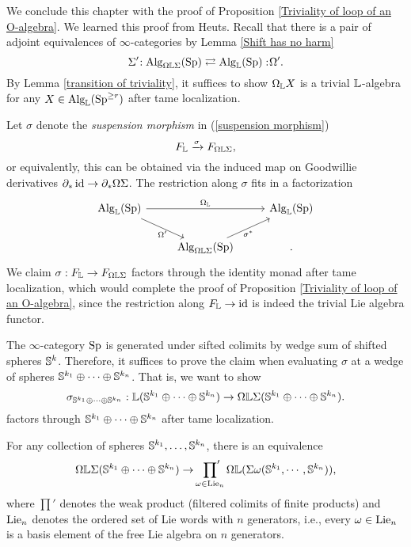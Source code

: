 We conclude this chapter with the proof of Proposition \ref{Triviality of loop of an O-algebra}.
We learned this proof from Heuts. 
Recall that there is a pair of adjoint equivalences of $\infty$-categories by Lemma \ref{Shift has no harm} 
$$
\Sigma'\negmedspace: \operatorname{Alg}_{\Omega {\mathbb{L}} \Sigma}(\operatorname{Sp}) \rightleftarrows \operatorname{Alg}_{{\mathbb{L}}}(\operatorname{Sp}):\negmedspace \Omega'.
$$
By Lemma \ref{transition of triviality},
it suffices to show $\Omega_{{\mathbb{L}}} X$ is a trivial ${\mathbb{L}}$-algebra for any $X\in \operatorname{Alg}_{{\mathbb{L}}}(\operatorname{Sp}^{\geq r})$ after tame localization.

Let $\sigma$ denote the \emph{suspension morphism} in (\ref{suspension morphism})
\[
F_{{\mathbb{L}}} \xrightarrow{\sigma} F_{\Omega {\mathbb{L}} \Sigma},
\]
or equivalently, this can be obtained via the induced map on Goodwillie derivatives
$\partial_{*}\operatorname{id} \to \partial_* \Omega \Sigma$.
The restriction along $\sigma$ fits in a factorization
\[
\begin{tikzcd}
	\Alg_{\BL}(\Sp) &   & \Alg_{\BL}(\Sp) \\
	&  \Alg_{\Omega \BL \Sigma}(\Sp) &
	\arrow[from=1-1, to = 1-3, "\Omega_{\BL}"]
	\arrow[from=1-1 , to =2-2, "\Omega'" below]
	\arrow[from=2-2, to=1-3, "\sigma^*" below].
\end{tikzcd}
\]
We claim $\sigma:F_{{\mathbb{L}}}\to F_{\Omega {\mathbb{L}} \Sigma}$ factors through the identity monad after tame localization, which would complete the proof of Proposition \ref{Triviality of loop of an O-algebra},
since the restriction along $F_{\mathbb{L}} \to \operatorname{id}$ is indeed the trivial Lie algebra functor. 

The $\infty$-category $\operatorname{Sp}$ is generated under sifted colimits by wedge sum of shifted spheres ${\mathbb{S}}^k$.
Therefore, it suffices to prove the claim when evaluating $\sigma$ at a wedge of spheres
${\mathbb{S}}^{k_1}\oplus \cdots \oplus {\mathbb{S}}^{k_n}$.
That is, we want to show 
$$
\sigma_{{\mathbb{S}}^{k_1}\oplus \cdots \oplus {\mathbb{S}}^{k_n}}: 
{\mathbb{L}}({\mathbb{S}}^{k_1}\oplus \cdots \oplus {\mathbb{S}}^{k_n})
\to 
\Omega {\mathbb{L}} \Sigma ({\mathbb{S}}^{k_1}\oplus \cdots \oplus {\mathbb{S}}^{k_n}).
$$
factors through ${\mathbb{S}}^{k_1}\oplus \cdots \oplus {\mathbb{S}}^{k_n}$ after tame localization.
\begin{theorem}
    For any collection of spheres ${\mathbb{S}}^{k_1}, \dots, {\mathbb{S}}^{k_n}$, there is an equivalence
    $$
    \Omega{\mathbb{L}}\Sigma({\mathbb{S}}^{k_1}\oplus \cdots \oplus {\mathbb{S}}^{k_n})
    \to 
    \sideset{}{'}\prod_{\omega \in \operatorname{Lie}_n} \Omega {\mathbb{L}} (\Sigma \omega({\mathbb{S}}^{k_1 }, \cdots, {\mathbb{S}}^{k_n })),
    $$
    where $\prod'$ denotes the weak product (filtered colimits of finite products) and $\operatorname{Lie}_n$ denotes the ordered set of Lie words with $n$ generators, i.e., every $\omega\in \operatorname{Lie}_n$ is a basis element of the free Lie algebra on $n$ generators.
\end{theorem}


